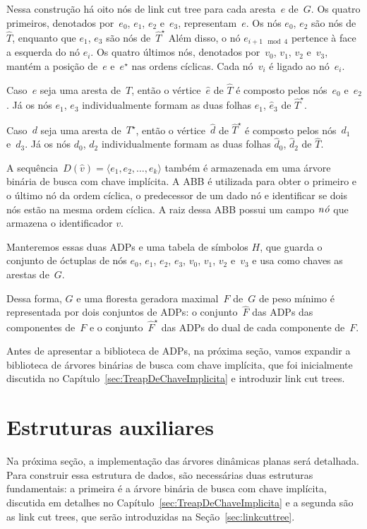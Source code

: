 Nessa construção há oito nós de link cut tree para cada aresta~$e$ de~$G$.
Os quatro primeiros, denotados por~$e_0$, $e_1$, $e_2$ e~$e_3$, representam~$e$.
Os nós $e_0$, $e_2$ são nós de~$\hat T$, enquanto que $e_1$, $e_3$ são nós de~$\hat T^\star$
Além disso, o nó $e_{i+1\mod 4}$ pertence à face a esquerda do nó $e_i$.
Os quatro últimos nós, denotados por~$v_0$, $v_1$, $v_2$ e~$v_3$, mantém a posição de~$e$ e~$e^\star$ nas ordens cíclicas.
Cada nó~$v_i$ é ligado ao nó~$e_i$.

Caso~$e$ seja uma aresta de~$T$, então o vértice~$\hat e$ de $\hat T$ é composto pelos nós~$e_0$ e~$e_2$.
Já os nós $e_1$, $e_3$ individualmente formam as duas folhas $\hat e_1$, $\hat e_3$ de $\hat T^\star$.

Caso~$d$ seja uma aresta de~$T^\star$, então o vértice~$\hat d$ de $\hat T^\star$ é composto pelos nós~$d_1$ e~$d_3$.
Já os nós $d_0$, $d_2$ individualmente formam as duas folhas $\hat d_0$, $\hat d_2$ de $\hat T$.

A sequência~$D(\hat v) = \langle e_1, e_2, \ldots, e_k\rangle$ também é armazenada em uma árvore binária de busca com chave implícita.
A ABB é utilizada para obter o primeiro e o último nó da ordem cíclica, o predecessor de um dado nó e identificar se dois nós estão na mesma ordem cíclica.
A raiz dessa ABB possui um campo $\mathit{n\acute{o}}$ que armazena o identificador $v$.

Manteremos essas duas ADPs e uma tabela de símbolos $H$, que guarda o conjunto de óctuplas de nós $e_0$, $e_1$, $e_2$, $e_3$, $v_0$, $v_1$, $v_2$ e~$v_3$ e usa como chaves as arestas de~$G$.

Dessa forma, $G$ e uma floresta geradora maximal~$F$ de~$G$ de peso mínimo é representada por dois conjuntos de ADPs: o conjunto~$\hat F$ das ADPs das componentes de~$F$ e o conjunto~$\hat F^\star$ das ADPs do dual de cada componente de~$F$.

Antes de apresentar a biblioteca de ADPs, na próxima seção, vamos expandir a biblioteca de árvores binárias de busca com chave implícita, que foi inicialmente discutida no Capítulo~\ref{sec:TreapDeChaveImplicita} e introduzir link cut trees.


\section{Estruturas auxiliares}

Na próxima seção, a implementação das árvores dinâmicas planas será detalhada. Para construir essa estrutura de dados, são necessárias duas estruturas fundamentais: a primeira é a árvore binária de busca com chave implícita, discutida em detalhes no Capítulo~\ref{sec:TreapDeChaveImplicita} e a segunda são as link cut trees, que serão introduzidas na Seção~\ref{sec:linkcuttree}.



